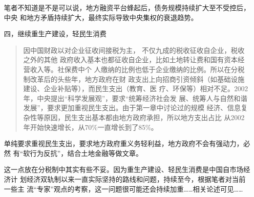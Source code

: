 笔者不知道是不是可以说，地方融资平台蜂起后，债务规模持续扩大至不受控后，中央
和地方矛盾持续扩大，最终实际导致中央集权的衰退趋势。

{\heiti 四，继续重生产建设，轻民生消费}

\begin{quotation}
  因中国财政以对企业征收间接税为主， 不仅九成的税收征收自企业，税收之外的其他
  政府收入基本也都征收自企业，比如土地转让费和国有资本经营收入等。社保费中个
  人缴纳的比例也低于企业缴纳的比例。所以在分税制改革后的头些年，地方政府在财
  政支出上向招商引资倾斜（如基础设施建设、企业补贴等），而民生支出（教育、医
  疗、环保等）相对不足。2002年，中央提出“科学发展观”，要求“统筹经济社会发
  展、统筹人与自然和谐发展”，要求更加重视民生支出。由于第一章中讨论过的规模
  经济、信息复杂性等原因，民生支出基本都由地方政府承担，所以地方支出占比
  从2002年开始快速增长，从70\%一直增长到了85\%。\cite{zhishenshinei}
\end{quotation}
单纯要求重视民生支出，要求地方政府重义务轻利益，地方政府不会有强动力，必然
有“软行为反抗”，结合土地金融等做文章。

这一点放在分税制中其实有些不妥。因为重生产建设、轻民生消费是中国自市场经济计
划经济双轨制以来一直实际坚持的路线和问题，持续至今，根据笔者对当前一些主
流“专家”观点的考察，这一问题很可能还会持续加重……相关论述可见……











